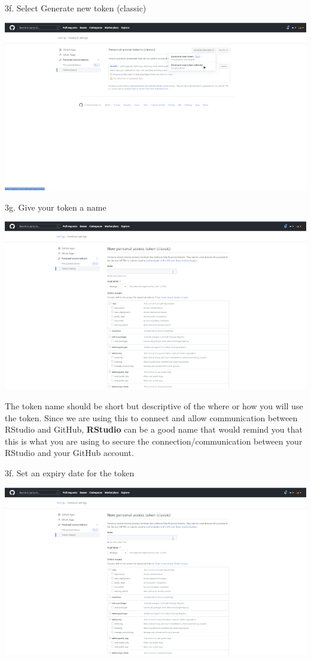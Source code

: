 \documentclass[
  12pt,
]{book}
\begin{document}
3f. Select Generate new token (classic)

\includegraphics{images/github_pat8.png}

3g. Give your token a name

\includegraphics{images/github_pat9.png}

The token name should be short but descriptive of the where or how you will use the token. Since we are using this to connect and allow communication between RStudio and GitHub, \textbf{RStudio} can be a good name that would remind you that this is what you are using to secure the connection/communication between your RStudio and your GitHub account.

3f. Set an expiry date for the token

\includegraphics{images/github_pat9.png}
\end{document}
